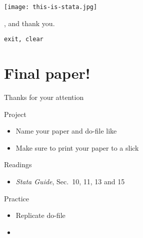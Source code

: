 \documentclass[t]{beamer}
\begin{document}

	\begin{frame}[t,plain]
			\vspace{.3\paperwidth}
		\begin{center}
			\texttt{[image: this-is-stata.jpg]}
		\end{center}
	\end{frame}

	\begin{frame}[t,plain]
			\vspace{.3\paperwidth}
		\begin{center}
			{\Large {}, and thank you.}\\
		\end{center}
			\vspace{1em}
			\hspace{.6\paperwidth}
			\texttt{exit, clear}		
	\end{frame}






	\section{Final paper!}


    \begin{frame}[c]{Thanks for your attention}
    
        \begin{alertblock}{Project}
            \begin{itemize}
                \item Name your paper and do-file like 
                \item Make sure to print your paper to a slick 
            \end{itemize}
        \end{alertblock}
        
        \begin{block}{Readings}
            \begin{itemize}
                \item \emph{Stata Guide}, Sec.~10, 11, 13 and 15
            \end{itemize}
        \end{block}
            
        \begin{exampleblock}{Practice}
            \begin{itemize}
                \item Replicate do-file
                \item {}
            \end{itemize}
        \end{exampleblock}
            
    \end{frame}
    
\end{document}
